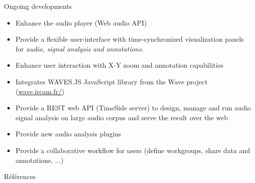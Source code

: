 \documentclass[final, hyperref, table]{beamer}
\begin{document}
\begin{frame}[containsverbatim]{}
\begin{columns}[T]
\begin{column}[T]{.5\linewidth}
  \begin{block}{Ongoing developments}
\vspace{-1cm}
    \begin{multicols}{2}[]
        \begin{itemize}
        \item Enhance the audio player (Web audio API) 
        \item Provide a flexible user-interface with time-synchronized \alert{visualization} panels for \emph{audio, signal analysis and annotations}.
         \item Enhance user interaction with \alert{X-Y zoom} and \alert{annotation} capabilities
          \item Integrates WAVES.JS JavaScript library from the Wave project (\url{wave.ircam.fr/})
        \item Provide a REST web API (TimeSide server) to design, manage and run audio signal analysis on large audio corpus and serve the result over the web
        \item Provide new audio analysis plugins
          \item Provide a collaborative workflow for users (define workgroups, share data and annotations, ...)

\end{itemize}
\end{multicols}
\end{block}

\begin{block}{Références}\tiny

\vspace{-1cm}
\begin{multicols}{2}[]

\end{multicols}
\end{block}
  
\end{column}
\end{columns}
\end{frame}
\end{document}
